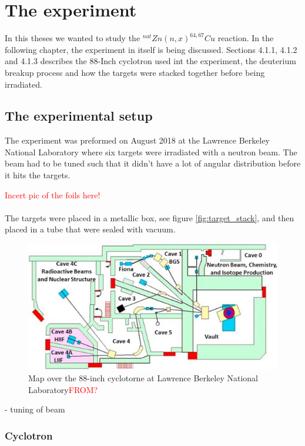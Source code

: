 \documentclass[twoside,english]{uiofysmaster/uiofysmaster}
\begin{document}
\chapter{The experiment}
\label{ch: experiment}

In this theses we wanted to study the $^{nat}Zn(n,x)^{64,67}Cu$ reaction. 
In the following chapter, the experiment in itself is being discussed. Sections 4.1.1, 4.1.2 and 4.1.3 describes the 88-Inch cyclotron used int the experiment, the deuterium breakup process and how the targets were stacked together before being irradiated.


\section{The experimental setup}
\label{sec: setup}

The experiment was preformed on August 2018 at the Lawrence Berkeley National Laboratory where six targets were irradiated with a neutron beam. The beam had to be tuned such that it didn't have a lot of angular distribution before it hits the targets. 

\textcolor{red}{Incert pic of the foils here!}
\\
\\
The targets were placed in a metallic box, see figure \ref{fig:target_stack}, and then placed in a tube that were sealed with vacuum. 

\begin{figure} [h]
   \centering
   \includegraphics[scale=1.2]{88-inch_cyclotrone.jpg}
   \caption{Map over the 88-inch cyclotorne at Lawrence Berkeley National Laboratory\textcolor{red}{FROM?}}
   \label{fig:88-inc_cyclotron}
\end{figure}

- tuning of beam

\subsection{Cyclotron}
\label{sec: cyclotron}
\end{document}
